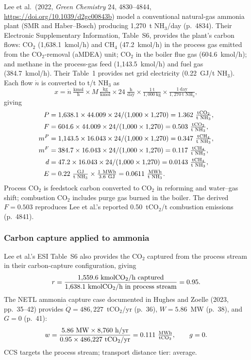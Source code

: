 \documentclass[11pt]{article}
\newcommand{\cotwo}{\ensuremath{\mathrm{CO_2}}}
\newcommand{\chfour}{\ensuremath{\mathrm{CH_4}}}
\begin{document}
Lee et al.\ (2022, \textit{Green Chemistry} 24, 4830--4844, \url{https://doi.org/10.1039/d2gc00843b}) model a conventional natural-gas ammonia plant (SMR and Haber--Bosch) producing 1{,}270~t NH$_3$/day (p.~4834). Their Electronic Supplementary Information, Table~S6, provides the plant's carbon flows: \cotwo{} (1{,}638.1~kmol/h) and \chfour{} (47.2~kmol/h) in the process gas emitted from the \cotwo{}-removal (aMDEA) unit; \cotwo{} in the boiler flue gas (604.6~kmol/h); and methane in the process-gas feed (1{,}143.5~kmol/h) and fuel gas (384.7~kmol/h). Their Table~1 provides net grid electricity (0.22~GJ/t NH$_3$). Each flow $\dot{n}$ is converted to t/t NH$_3$ as
%
\[
  x = \dot{n}~\tfrac{\text{kmol}}{\text{h}} \times M~\tfrac{\text{kg}}{\text{kmol}} \times 24~\tfrac{\text{h}}{\text{day}} \times \tfrac{1~\text{t}}{1{,}000~\text{kg}} \times \tfrac{1~\text{day}}{1{,}270~\text{t NH}_3},
\]
%
giving
%
\begin{align*}
  P &= 1{,}638.1 \times 44.009 \times 24 / (1{,}000 \times 1{,}270) = 1.362~\tfrac{\text{t\cotwo{}}}{\text{t NH}_3}, \\
  F &= 604.6 \times 44.009 \times 24 / (1{,}000 \times 1{,}270) = 0.503~\tfrac{\text{t\cotwo{}}}{\text{t NH}_3}, \\
  m^P &= 1{,}143.5 \times 16.043 \times 24 / (1{,}000 \times 1{,}270) = 0.347~\tfrac{\text{t\chfour{}}}{\text{t NH}_3}, \\
  m^F &= 384.7 \times 16.043 \times 24 / (1{,}000 \times 1{,}270) = 0.117~\tfrac{\text{t\chfour{}}}{\text{t NH}_3}, \\
  d &= 47.2 \times 16.043 \times 24 / (1{,}000 \times 1{,}270) = 0.0143~\tfrac{\text{t\chfour{}}}{\text{t NH}_3}, \\
  E &= 0.22~\tfrac{\text{GJ}}{\text{t NH}_3} \times \tfrac{1~\text{MWh}}{3.6~\text{GJ}} = 0.0611~\tfrac{\text{MWh}}{\text{t NH}_3}.
\end{align*}
%
Process \cotwo{} is feedstock carbon converted to \cotwo{} in reforming and water--gas shift; combustion \cotwo{} includes purge gas burned in the boiler. The derived $F = 0.503$ reproduces Lee et al.'s reported 0.50~t\cotwo{}/t combustion emissions (p.~4841).

\subsubsection{Carbon capture applied to ammonia}

Lee et al.'s ESI Table~S6 also provides the \cotwo{} captured from the process stream in their carbon-capture configuration, giving
%
\[
  r = \frac{1{,}559.6~\text{kmol\cotwo{}/h captured}}{1{,}638.1~\text{kmol\cotwo{}/h in process stream}} = 0.95.
\]
%
The NETL ammonia capture case documented in Hughes and Zoelle (2023, pp.~35--42) provides $\dot{Q} = 486{,}227$~t\cotwo{}/yr (p.~36), $W = 5.86$~MW (p.~38), and $G = 0$ (p.~41):
%
\[
  w = \frac{5.86~\text{MW} \times 8{,}760~\text{h/yr}}{0.95 \times 486{,}227~\text{t\cotwo{}/yr}} = 0.111~\tfrac{\text{MWh}}{\text{t\cotwo{}}}, \qquad g = 0.
\]
%
CCS targets the process stream; transport distance tier: average.
\end{document}
